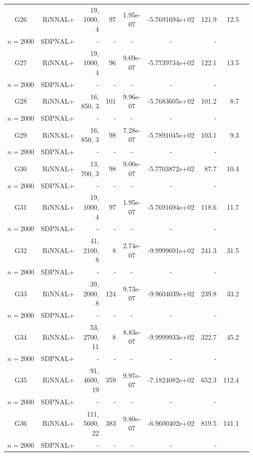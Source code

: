 \documentclass[11pt]{article}
\theoremstyle{plain}
\begin{document}
\begin{footnotesize}
\begin{longtable}[c]{crrrccrrr}
G26& RiNNAL+ & 19, 1000, 4 & 97 & 1.95e-07 & -5.7691694e+02 & 121.9 &12.5 \\ 
$n=2000$ & SDPNAL+ & - & - & - & - & - \\ [3pt] 

G27& RiNNAL+ & 19, 1000, 4 & 96 & 9.69e-07 & -5.7739734e+02 & 122.1 &13.5 \\ 
$n=2000$ & SDPNAL+ & - & - & - & - & - \\ [3pt] 

G28& RiNNAL+ & 16, 850, 3 & 101 & 9.96e-07 & -5.7683605e+02 & 101.2 &8.7 \\ 
$n=2000$ & SDPNAL+ & - & - & - & - & - \\ [3pt] 

G29& RiNNAL+ & 16, 850, 3 & 98 & 7.28e-07 & -5.7891045e+02 & 103.1 &9.3 \\ 
$n=2000$ & SDPNAL+ & - & - & - & - & - \\ [3pt] 

G30& RiNNAL+ & 13, 700, 3 & 98 & 9.00e-07 & -5.7703872e+02 & 87.7 &10.4 \\ 
$n=2000$ & SDPNAL+ & - & - & - & - & - \\ [3pt] 

G31& RiNNAL+ & 19, 1000, 4 & 97 & 1.95e-07 & -5.7691694e+02 & 118.6 &11.7 \\ 
$n=2000$ & SDPNAL+ & - & - & - & - & - \\ [3pt] 

G32& RiNNAL+ & 41, 2100, 8 & 8 & 2.74e-07 & -9.9999691e+02 & 241.3 &31.5 \\ 
$n=2000$ & SDPNAL+ & - & - & - & - & - \\ [3pt] 

G33& RiNNAL+ & 39, 2000, 8 & 124 & 9.73e-07 & -9.9604039e+02 & 239.8 &33.2 \\ 
$n=2000$ & SDPNAL+ & - & - & - & - & - \\ [3pt] 

G34& RiNNAL+ & 53, 2700, 11 & 8 & 8.83e-07 & -9.9999933e+02 & 322.7 &45.2 \\ 
$n=2000$ & SDPNAL+ & - & - & - & - & - \\ [3pt] 

G35& RiNNAL+ & 91, 4600, 19 & 359 & 9.97e-07 & -7.1824082e+02 & 652.3 &112.4 \\ 
$n=2000$ & SDPNAL+ & - & - & - & - & - \\ [3pt] 

G36& RiNNAL+ & 111, 5600, 22 & 383 & 9.80e-07 & -6.9600402e+02 & 819.5 &141.1 \\ 
$n=2000$ & SDPNAL+ & - & - & - & - & - \\ [3pt] 


\end{longtable}
\end{footnotesize}
\end{document}
